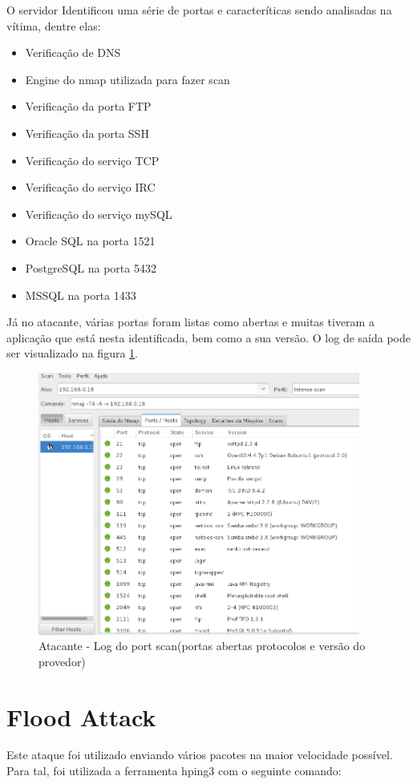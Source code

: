 	O servidor Identificou uma série de portas e caracteríticas sendo analisadas na
	vítima, dentre elas:

	\begin{itemize}
		\item Verificação de DNS
		\item Engine do nmap utilizada para fazer scan
		\item Verificação da porta FTP
		\item Verificação da porta SSH
		\item Verificação do serviço TCP
		\item Verificação do serviço IRC
		\item Verificação do serviço mySQL
		\item Oracle SQL na porta 1521
		\item PostgreSQL na porta 5432
		\item MSSQL na porta 1433
	\end{itemize}

	Já no atacante, várias portas foram listas como abertas e muitas tiveram a aplicação
	que está nesta identificada, bem como a sua versão. O log de saída pode ser visualizado
	na figura \ref{fig:atacante_log_port_scan}.

	 \begin{figure}[h]
 	 \centering
 	 \includegraphics[width=400px, scale=1]{resource/atacante_log_port_scan}
 	 \caption{Atacante - Log do port scan(portas abertas protocolos e versão do provedor)}
  \label{fig:atacante_log_port_scan}
  \end{figure}

	\section{Flood Attack}
	\label{sec:Flood Attack}
	Este ataque foi utilizado enviando vários pacotes na maior velocidade possível.
	Para tal, foi utilizada a ferramenta hping3 com o seguinte comando:

